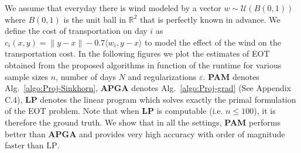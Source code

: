 We assume that everyday there is wind modeled by a vector $w\sim \mathcal{U}(B(0,1))$ where $B(0,1)$ is the unit ball in $\mathbb {R}^2$ that is perfectly known in advance. We define the cost of transportation on day $i$ as $c_i(x,y) = \lVert y-x\rVert -0.7 \langle w_i,y-x\rangle$ to model the effect of the wind on the transportation cost. In the following figures we plot the estimates of EOT obtained from the proposed algorithms in function of the runtime for various sample sizes $n$, number of days $N$ and regularizations $\varepsilon$. \textbf{PAM} denotes Alg.~\ref{algo:Proj-Sinkhorn}, \textbf{APGA} denotes Alg.~\ref{algo:Proj-grad} (See Appendix C.4), \textbf{LP} denotes the linear program which solves exactly the primal formulation of the EOT problem. Note that when $\textbf{LP}$ is computable (i.e. $n\leq 100$), it is therefore the ground truth. We show that in all the settings, \textbf{PAM} performs better than $\textbf{APGA}$ and provides very high accuracy with order of magnitude faster than $\text{LP}$. 

